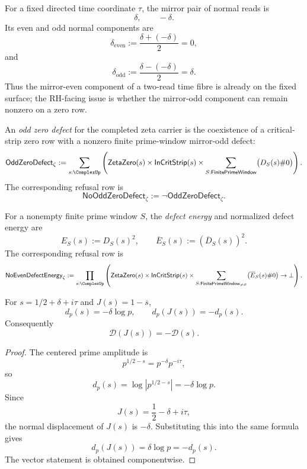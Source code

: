 \begin{definition}
\label{def:unified-reality-time-fibre-even-odd-normal-reads}
For a fixed directed time coordinate $\tau$, the mirror pair of normal
reads is
$$
\delta,
\qquad
-\delta.
$$
Its even and odd normal components are
$$
\delta_{\mathrm{even}}
:=
\frac{\delta+(-\delta)}2
=0,
$$
and
$$
\delta_{\mathrm{odd}}
:=
\frac{\delta-(-\delta)}2
=\delta.
$$
Thus the mirror-even component of a two-read time fibre is already on
the fixed surface; the RH-facing issue is whether the mirror-odd
component can remain nonzero on a zero row.
\end{definition}

\begin{definition}
\label{def:unified-reality-odd-zero-defect}
An \emph{odd zero defect} for the completed zeta carrier is the
coexistence of a critical-strip zero row with a nonzero finite
prime-window mirror-odd defect:
$$
\mathsf{OddZeroDefect}_{\zeta}
:=
\sum_{s:\ComplexUp}
\left(
\mathsf{ZetaZero}(s)
\times
\mathsf{InCritStrip}(s)
\times
\sum_{S:\mathsf{FinitePrimeWindow}}
\bigl(D_S(s)\#0\bigr)
\right).
$$
The corresponding refusal row is
$$
\mathsf{NoOddZeroDefect}_{\zeta}
:=
\neg\mathsf{OddZeroDefect}_{\zeta}.
$$
\end{definition}

\begin{definition}
\label{def:unified-reality-even-defect-energy}
For a nonempty finite prime window $S$, the \emph{defect energy} and
normalized defect energy are
$$
E_S(s):=D_S(s)^2,
\qquad
\overline E_S(s):=\left(\overline D_S(s)\right)^2.
$$
The corresponding refusal row is
$$
\mathsf{NoEvenDefectEnergy}_{\zeta}
:=
\prod_{s:\ComplexUp}
\left(
\mathsf{ZetaZero}(s)
\times
\mathsf{InCritStrip}(s)
\times
\sum_{S:\mathsf{FinitePrimeWindow}_{\ne\varnothing}}
\bigl(\overline E_S(s)\#0\bigr)
\to
\bot
\right).
$$
\end{definition}

\begin{theorem}
\label{thm:unified-reality-prime-defect-mirror-odd}
For $s=1/2+\delta+i\tau$ and $J(s)=1-\overline{s}$,
$$
d_p(s)=-\delta\log p,
\qquad
d_p(J(s))=-d_p(s).
$$
Consequently
$$
\mathcal D(J(s))=-\mathcal D(s).
$$
\end{theorem}

\begin{proof}
The centered prime amplitude is
$$
p^{1/2-s}=p^{-\delta}p^{-i\tau},
$$
so
$$
d_p(s)=\log |p^{1/2-s}|=-\delta\log p.
$$
Since
$$
J(s)=\frac12-\delta+i\tau,
$$
the normal displacement of $J(s)$ is $-\delta$.  Substituting this into
the same formula gives
$$
d_p(J(s))=\delta\log p=-d_p(s).
$$
The vector statement is obtained componentwise.
\end{proof}

